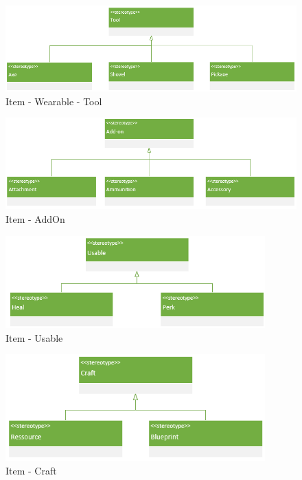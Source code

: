 \begin{figure}[H]
    \begin{center}
    \includegraphics[width=14cm]{10_img/Z_annexeA/item_werable_tool.PNG}
    \caption{Item - Wearable - Tool}
    \label{A-Tool}
    \end{center}
\end{figure}

\begin{figure}[H]
    \begin{center}
    \includegraphics[width=14cm]{10_img/Z_annexeA/item_addon.PNG}
    \caption{Item - AddOn}
    \label{A-Add-on}
    \end{center}
\end{figure}

\begin{figure}[H]
    \begin{center}
    \includegraphics[width=10cm]{10_img/Z_annexeA/item_usable.PNG}
    \caption{Item - Usable}
    \label{A-Usable}
    \end{center}
\end{figure}

\begin{figure}[H]
    \begin{center}
    \includegraphics[width=10cm]{10_img/Z_annexeA/item_craft.PNG}
    \caption{Item - Craft}
    \label{A-Craft}
    \end{center}
\end{figure}

